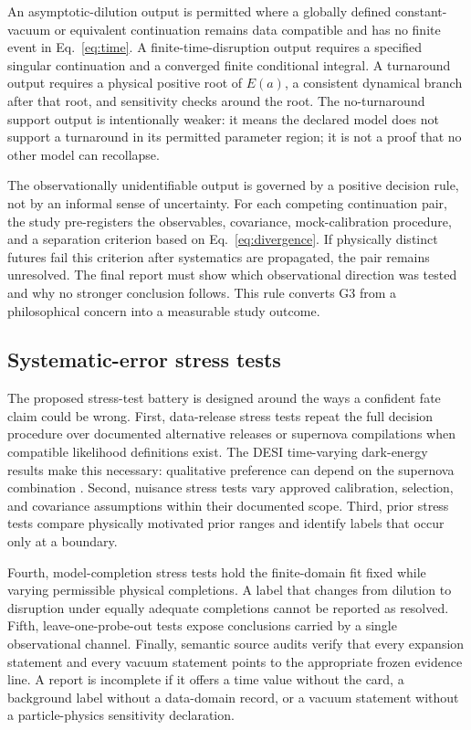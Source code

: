 \documentclass[conference]{IEEEtran}
\begin{document}
An asymptotic-dilution output is permitted where a globally defined constant-vacuum or equivalent continuation remains data compatible and has no finite event in Eq.~\eqref{eq:time}. A finite-time-disruption output requires a specified singular continuation and a converged finite conditional integral. A turnaround output requires a physical positive root of \(E(a)\), a consistent dynamical branch after that root, and sensitivity checks around the root. The no-turnaround support output is intentionally weaker: it means the declared model does not support a turnaround in its permitted parameter region; it is not a proof that no other model can recollapse.

The observationally unidentifiable output is governed by a positive decision rule, not by an informal sense of uncertainty. For each competing continuation pair, the study pre-registers the observables, covariance, mock-calibration procedure, and a separation criterion based on Eq.~\eqref{eq:divergence}. If physically distinct futures fail this criterion after systematics are propagated, the pair remains unresolved. The final report must show which observational direction was tested and why no stronger conclusion follows. This rule converts G3 from a philosophical concern into a measurable study outcome.

\subsection{Systematic-error stress tests}

The proposed stress-test battery is designed around the ways a confident fate claim could be wrong. First, data-release stress tests repeat the full decision procedure over documented alternative releases or supernova compilations when compatible likelihood definitions exist. The DESI time-varying dark-energy results make this necessary: qualitative preference can depend on the supernova combination \cite{desi2025}. Second, nuisance stress tests vary approved calibration, selection, and covariance assumptions within their documented scope. Third, prior stress tests compare physically motivated prior ranges and identify labels that occur only at a boundary.

Fourth, model-completion stress tests hold the finite-domain fit fixed while varying permissible physical completions. A label that changes from dilution to disruption under equally adequate completions cannot be reported as resolved. Fifth, leave-one-probe-out tests expose conclusions carried by a single observational channel. Finally, semantic source audits verify that every expansion statement and every vacuum statement points to the appropriate frozen evidence line. A report is incomplete if it offers a time value without the card, a background label without a data-domain record, or a vacuum statement without a particle-physics sensitivity declaration.
\end{document}
